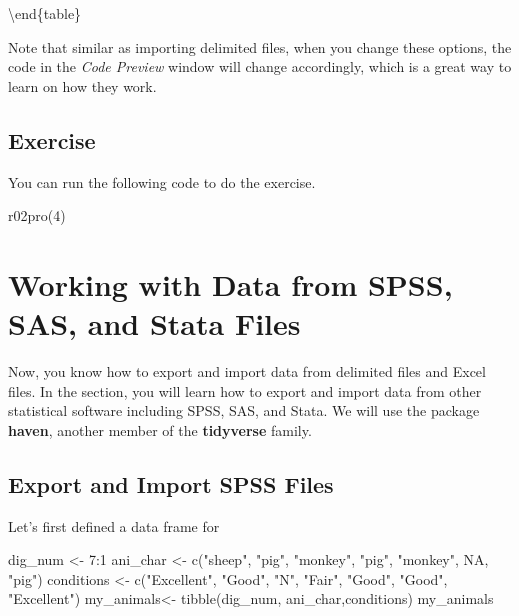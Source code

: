 \documentclass[
]{book}
\newenvironment{Shaded}{\begin{snugshade}}{\end{snugshade}}
\newcommand{\ConstantTok}[1]{\textcolor[rgb]{0.00,0.00,0.00}{#1}}
\newcommand{\DecValTok}[1]{\textcolor[rgb]{0.00,0.00,0.81}{#1}}
\newcommand{\FunctionTok}[1]{\textcolor[rgb]{0.00,0.00,0.00}{#1}}
\newcommand{\NormalTok}[1]{#1}
\newcommand{\OtherTok}[1]{\textcolor[rgb]{0.56,0.35,0.01}{#1}}
\newcommand{\SpecialCharTok}[1]{\textcolor[rgb]{0.00,0.00,0.00}{#1}}
\newcommand{\StringTok}[1]{\textcolor[rgb]{0.31,0.60,0.02}{#1}}
\begin{document}
\textbackslash end\{table\}

Note that similar as importing delimited files, when you change these options, the code in the \emph{Code Preview} window will change accordingly, which is a great way to learn on how they work.

\hypertarget{exercise-10}{%
\subsection{Exercise}\label{exercise-10}}

You can run the following code to do the exercise.

\begin{Shaded}
\begin{Highlighting}[]
\FunctionTok{r02pro}\NormalTok{(}\DecValTok{4}\NormalTok{)}
\end{Highlighting}
\end{Shaded}

\hypertarget{import-other}{%
\section{Working with Data from SPSS, SAS, and Stata Files}\label{import-other}}

Now, you know how to export and import data from delimited files and Excel files. In the section, you will learn how to export and import data from other statistical software including SPSS, SAS, and Stata. We will use the package \textbf{haven}, another member of the \textbf{tidyverse} family.

\hypertarget{export-and-import-spss-files}{%
\subsection{Export and Import SPSS Files}\label{export-and-import-spss-files}}

Let's first defined a data frame for

\begin{Shaded}
\begin{Highlighting}[]
\NormalTok{dig\_num }\OtherTok{\textless{}{-}} \DecValTok{7}\SpecialCharTok{:}\DecValTok{1}
\NormalTok{ani\_char }\OtherTok{\textless{}{-}} \FunctionTok{c}\NormalTok{(}\StringTok{"sheep"}\NormalTok{, }\StringTok{"pig"}\NormalTok{, }\StringTok{"monkey"}\NormalTok{, }\StringTok{"pig"}\NormalTok{, }\StringTok{"monkey"}\NormalTok{, }\ConstantTok{NA}\NormalTok{, }\StringTok{"pig"}\NormalTok{)}
\NormalTok{conditions }\OtherTok{\textless{}{-}} \FunctionTok{c}\NormalTok{(}\StringTok{"Excellent"}\NormalTok{, }\StringTok{"Good"}\NormalTok{, }\StringTok{"N"}\NormalTok{, }\StringTok{"Fair"}\NormalTok{, }\StringTok{"Good"}\NormalTok{, }\StringTok{"Good"}\NormalTok{, }\StringTok{"Excellent"}\NormalTok{)}
\NormalTok{my\_animals}\OtherTok{\textless{}{-}} \FunctionTok{tibble}\NormalTok{(dig\_num, ani\_char,conditions)}
\NormalTok{my\_animals}
\end{Highlighting}
\end{Shaded}
\end{document}

